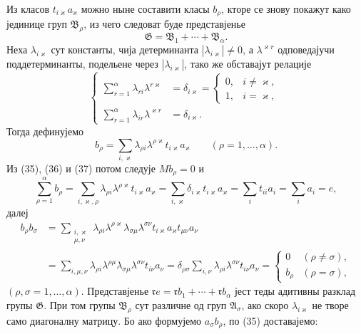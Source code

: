 ﻿\documentclass[11pt]{article}
\begin{document}
Из класов \(t_{i\varkappa}a_\varkappa\) можно ныне составити класы \(b_\rho\), кторе се знову покажут како јединице груп \(\mathfrak B_\rho\), из чего следоват буде представјенье
\[
 \mathfrak G=\mathfrak B_1+\cdots+\mathfrak B_\alpha.
\]
Неха \(\lambda_{i\varkappa}\) сут константы, чија детерминанта \(|\lambda_{i\varkappa}|\ne0\), а \(\lambda^{\varkappa r}\) одповедајучи поддетерминанты, подельене через \(|\lambda_{i\varkappa}|\), тако же обставајут релације
\begin{equation}
\left\{
\begin{aligned}
 \sum_{r=1}^{\alpha}\lambda_{ri}\lambda^{r\varkappa}&=\delta_{i\varkappa}=\begin{cases}0,&i\ne\varkappa,\\1,&i=\varkappa,
 \end{cases}\\
 \sum_{r=1}^{\alpha}\lambda_{ir}\lambda^{\varkappa r}&=\delta_{i\varkappa}.
\end{aligned}\right.
\tag{36}
\end{equation}
Тогда дефинујемо
\begin{equation}
 b_\rho=\sum_{i,\varkappa}\lambda_{\rho i}\lambda^{\rho\varkappa}t_{i\varkappa}a_\varkappa
 \qquad(\rho=1,
\ldots,\alpha).
\tag{37}
\end{equation}
Из (35), (36) и (37) потом следује \(Mb_\rho=0\) и
\begin{equation}
 \sum_{\rho=1}^{\alpha}b_\rho
 =\sum_{i,\varkappa,\rho}\lambda_{\rho i}\lambda^{\rho\varkappa}t_{i\varkappa}a_\varkappa
 =\sum_{i,\varkappa}\delta_{i\varkappa}t_{i\varkappa}a_\varkappa
 =\sum_i t_{ii}a_i=\sum_i a_i=e,
\tag{38}
\end{equation}
далеј
\[
\begin{aligned}
 b_\rho b_\sigma
 &=\sum_{\substack{i,\varkappa\\ \mu,\nu}}
  \lambda_{\rho i}\lambda^{\rho\varkappa}\lambda_{\sigma\mu}\lambda^{\sigma\nu}
  t_{i\varkappa}a_\varkappa t_{\mu\nu}a_\nu \\
 &=\sum_{i,\mu,\nu}\lambda_{\rho i}\lambda^{\rho\mu}\lambda_{\sigma\mu}\lambda^{\sigma\nu}t_{i\nu}a_\nu
 =\delta_{\rho\sigma}\sum_{i,\nu}\lambda_{\rho i}\lambda^{\sigma\nu}t_{i\nu}a_\nu
 =\begin{cases}0&(\rho\ne\sigma),\\ b_\rho&(\rho=\sigma),\end{cases}
\end{aligned}
\]
\((\rho,\sigma=1,
\ldots,\alpha)\). Представјенье \(\mathfrak r e=\mathfrak r b_1+\cdots+\mathfrak r b_\alpha\) јест теды адитивны разклад групы \(\mathfrak G\). При том групы \(\mathfrak B_\rho\) сут различне од груп \(\mathfrak A_\sigma\), ако скоро \(\lambda_{i\varkappa}\) не творе само диагоналну матрицу. Бо ако формујемо \(a_\sigma b_\rho\), по (35) доставајемо:
\end{document}
